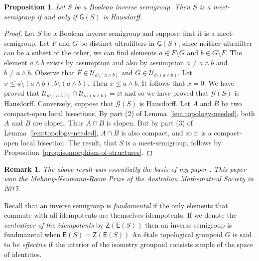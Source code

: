 \documentclass[a4paper]{amsart}
\newtheorem{proposition}[theorem]{Proposition}
\newtheorem{remark}[theorem]{Remark}
\begin{document}
\begin{proposition}\label{prop:ttwo} Let $S$ be a Boolean inverse semigroup.
Then $S$ is a meet-semigroup if and only if $\mathsf{G}(S)$ is Hausdorff.
\end{proposition}
\begin{proof} Let $S$ be a Boolean inverse semigroup and suppose that it is a meet-semigroup.
Let $F$ and $G$ be distinct ultrafilters in $\mathsf{G}(S)$,
since neither ultrafilter can be a subset of the other,
we can find elements $a \in F \setminus G$ and $b \in G \setminus F$.
The element $a \wedge b$ exists by assumption and also by assumption $a \neq a \wedge b$ and $b \neq a \wedge b$.
Observe that $F \in \mathscr{U}_{a \setminus (a \wedge b)}$ 
and
$G \in \mathscr{U}_{b \setminus (a \wedge b)}$.
Let $x \leq a \setminus (a \wedge b), b \setminus (a \wedge b)$.
Then $x \leq a \wedge b$.
It follows that $x = 0$.
We have proved that $\mathscr{U}_{a \setminus (a \wedge b)} \cap \mathscr{U}_{b \setminus (a \wedge b)} = \varnothing$
and so we have proved that $\mathscr{G}(S)$ is Hausdorff.
Conversely, suppose that $\mathscr{G}(S)$ is Hausdorff.
Let $A$ and $B$ be two compact-open local bisections.
By part (2) of Lemma~\ref{lem:topology-needed}, both $A$ and $B$ are clopen.
Thus $A \cap B$ is clopen.
But by part (3) of Lemma~\ref{lem:topology-needed},
$A \cap B$ is also compact, and so it is a compact-open local bisection.
The result, that $S$ is a meet-semigroup, follows by Proposition~\ref{prop:isomorphism-of-structures}.
\end{proof}

\begin{remark}{\em The above result was essentially the basis of my paper \cite{Lawson3}. 
This paper won the Mahony-Neumann-Room Prize of the Australian Mathematical Society in 2017.}
\end{remark}


Recall that an inverse semigroup is {\em fundamental} if the only elements
that commute with all idempotents are themselves idempotents.
If we denote the {\em centralizer of the idempotents} by $\mathsf{Z}(\mathsf{E}(S))$
then an inverse semigroup is fundmanetal when  $\mathsf{E}(S) = \mathsf{Z}(\mathsf{E}(S))$
An \'etale topological groupoid $G$ is said to be {\em effective} if the 
interior of the isometry groupoid consists simple of the space of identities.
\end{document}
